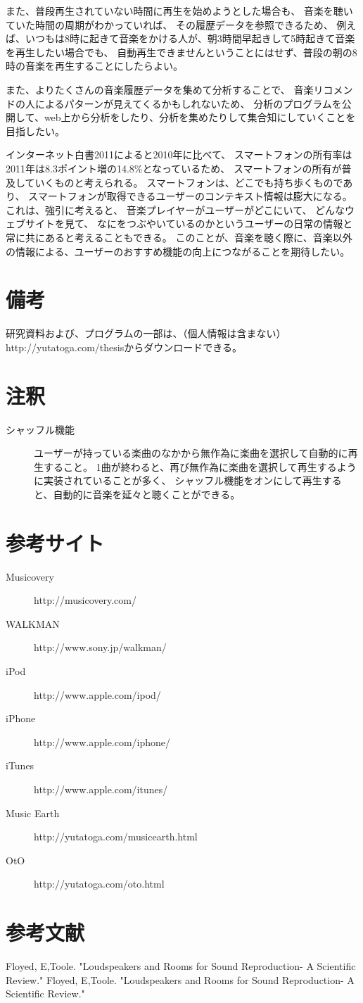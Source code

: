 \documentclass[11pt, twocolumn]{jsarticle}
\begin{document}
また、普段再生されていない時間に再生を始めようとした場合も、
音楽を聴いていた時間の周期がわかっていれば、
その履歴データを参照できるため、
例えば、いつもは8時に起きて音楽をかける人が、朝3時間早起きして5時起きて音楽を再生したい場合でも、
自動再生できませんということにはせず、普段の朝の8時の音楽を再生することにしたらよい。

また、よりたくさんの音楽履歴データを集めて分析することで、
音楽リコメンドの人によるパターンが見えてくるかもしれないため、
分析のプログラムを公開して、web上から分析をしたり、分析を集めたりして集合知にしていくことを目指したい。


インターネット白書2011によると2010年に比べて、
スマートフォンの所有率は2011年は8.3ポイント増の14.8\%となっているため、
スマートフォンの所有が普及していくものと考えられる。
スマートフォンは、どこでも持ち歩くものであり、
スマートフォンが取得できるユーザーのコンテキスト情報は膨大になる。
これは、強引に考えると、
音楽プレイヤーがユーザーがどこにいて、
どんなウェブサイトを見て、
なにをつぶやいているのかというユーザーの日常の情報と常に共にあると考えることもできる。
このことが、音楽を聴く際に、音楽以外の情報による、ユーザーのおすすめ機能の向上につながることを期待したい。

\section{備考}
研究資料および、プログラムの一部は、（個人情報は含まない）
http://yutatoga.com/thesisからダウンロードできる。

\section{注釈}
\begin{description}
\item[シャッフル機能]
ユーザーが持っている楽曲のなかから無作為に楽曲を選択して自動的に再生すること。
1曲が終わると、再び無作為に楽曲を選択して再生するように実装されていることが多く、
シャッフル機能をオンにして再生すると、自動的に音楽を延々と聴くことができる。
\end{description}

\section{参考サイト}
\begin{description}
\item[Musicovery]
http://musicovery.com/
\item[WALKMAN]
http://www.sony.jp/walkman/
\item[iPod]
http://www.apple.com/ipod/
\item[iPhone]
http://www.apple.com/iphone/
\item[iTunes]
http://www.apple.com/itunes/
\item[Music Earth]
http://yutatoga.com/musicearth.html
\item[OtO]
http://yutatoga.com/oto.html

\end{description}

\section{参考文献}
\begin{thebibliography}{99}
Floyed, E,Toole. "Loudspeakers and Rooms for Sound Reproduction- A Scientific Review." 
Floyed, E,Toole. "Loudspeakers and Rooms for Sound Reproduction- A Scientific Review." 
\end{thebibliography}
\end{document}
